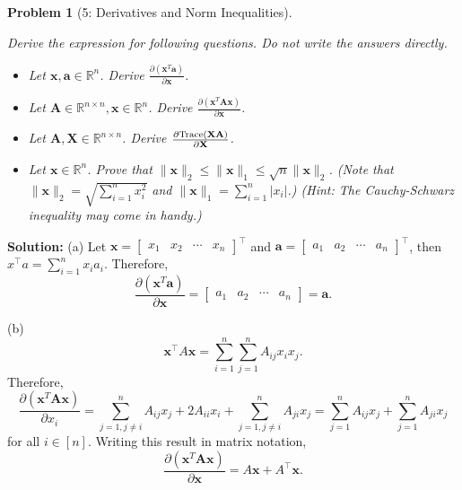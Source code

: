 \documentclass[11pt]{exam}
\theoremstyle{quest}
\newtheorem*{question}{Problem}
\newcommand{\R}{\mathbb{R}}
\begin{document}
\newpage


\begin{question}[5: Derivatives and Norm Inequalities]
~

Derive the expression for following questions. Do not write the answers directly.
\begin{itemize}
\item[(a)] Let $\textbf{x}, \textbf{a} \in \R^n$. Derive
  $\frac{\partial \left(\textbf{x}^T\textbf{a}\right)}{\partial \textbf{x}}$.
\item[(b)] Let $\textbf{A} \in \R^{n \times n}, \textbf{x} \in \R^n$.
  Derive
  $\frac{\partial \left(\textbf{x}^T\textbf{A}\textbf{x} \right)}{\partial
    \textbf{x}}$.
\item[(c)] Let $\textbf{A}, \textbf{X} \in \R^{n\times n}$. Derive
  $\frac{\partial \text{Trace(\textbf{XA})}}{\partial \textbf{X}}$.
\item[(d)] Let $\textbf{x}\in \R^n$. Prove that
  $\|\textbf{x}\|_2 \leq \|\textbf{x}\|_1 \leq \sqrt{n}\|\textbf{x}\|_2$. (Note
  that $\|\textbf{x}\|_2=\sqrt{\sum_{i=1}^{n} x_i^2}$ and
  $\|\textbf{x}\|_1=\sum_{i=1}^{n} |x_i|$.) (Hint: The Cauchy-Schwarz inequality may come in handy.)
\end{itemize}
\end{question}
\textbf{Solution:}
(a) Let $\textbf{x} =\begin{bmatrix} x_1 & x_2 & \cdots & x_n\end{bmatrix}^\top$  and $\textbf{a} =\begin{bmatrix} a_1 & a_2 & \cdots & a_n\end{bmatrix}^\top$, then $x^\top a = \sum_{i=1}^n x_i a_i$. Therefore, 
\[
\frac{\partial \left(\textbf{x}^T\textbf{a}\right)}{\partial \textbf{x}} = \begin{bmatrix} a_1 & a_2 & \cdots & a_n\end{bmatrix} = \textbf{a}.
\]


(b)
\[
\textbf{x}^\top A \textbf{x} = \sum_{i=1}^n \sum_{j=1}^n A_{ij}x_i x_j.
\]
Therefore,
\[
\frac{\partial \left(\textbf{x}^T\textbf{A}\textbf{x} \right)}{\partial
    x_i} = \sum_{j=1, j \neq i}^n A_{ij}x_j + 2A_{ii}x_i + \sum_{j=1, j \neq i}^n A_{ji}x_j = \sum_{j=1}^n A_{ij}x_j + \sum_{j=1}^n A_{ji}x_j
\]
for all $i \in [n]$. 
Writing this result in matrix notation, 
\[
\frac{\partial \left(\textbf{x}^T\textbf{A}\textbf{x} \right)}{\partial
    \textbf{x}} = A\textbf{x} + A^\top \textbf{x}.
\]
\end{document}
